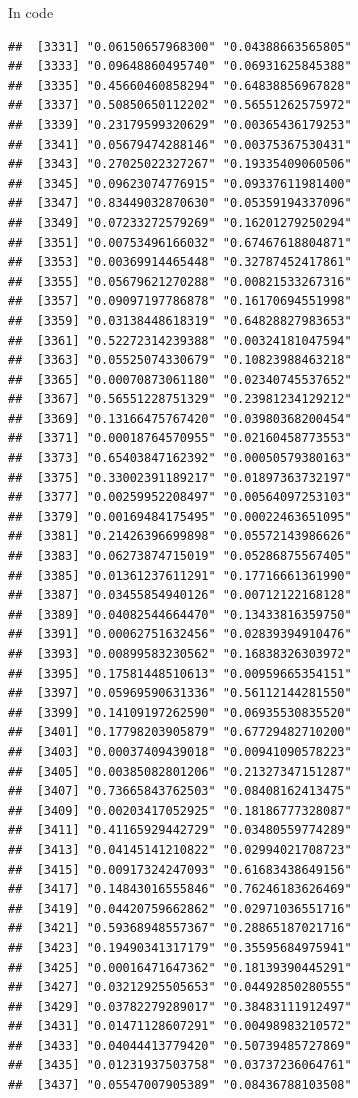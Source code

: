 \documentclass[ignorenonframetext,]{beamer}
\begin{document}
\begin{frame}[fragile]{In code}
\begin{verbatim}
##  [3331] "0.06150657968300" "0.04388663565805"
##  [3333] "0.09648860495740" "0.06931625845388"
##  [3335] "0.45660460858294" "0.64838856967828"
##  [3337] "0.50850650112202" "0.56551262575972"
##  [3339] "0.23179599320629" "0.00365436179253"
##  [3341] "0.05679474288146" "0.00375367530431"
##  [3343] "0.27025022327267" "0.19335409060506"
##  [3345] "0.09623074776915" "0.09337611981400"
##  [3347] "0.83449032870630" "0.05359194337096"
##  [3349] "0.07233272579269" "0.16201279250294"
##  [3351] "0.00753496166032" "0.67467618804871"
##  [3353] "0.00369914465448" "0.32787452417861"
##  [3355] "0.05679621270288" "0.00821533267316"
##  [3357] "0.09097197786878" "0.16170694551998"
##  [3359] "0.03138448618319" "0.64828827983653"
##  [3361] "0.52272314239388" "0.00324181047594"
##  [3363] "0.05525074330679" "0.10823988463218"
##  [3365] "0.00070873061180" "0.02340745537652"
##  [3367] "0.56551228751329" "0.23981234129212"
##  [3369] "0.13166475767420" "0.03980368200454"
##  [3371] "0.00018764570955" "0.02160458773553"
##  [3373] "0.65403847162392" "0.00050579380163"
##  [3375] "0.33002391189217" "0.01897363732197"
##  [3377] "0.00259952208497" "0.00564097253103"
##  [3379] "0.00169484175495" "0.00022463651095"
##  [3381] "0.21426396699898" "0.05572143986626"
##  [3383] "0.06273874715019" "0.05286875567405"
##  [3385] "0.01361237611291" "0.17716661361990"
##  [3387] "0.03455854940126" "0.00712122168128"
##  [3389] "0.04082544664470" "0.13433816359750"
##  [3391] "0.00062751632456" "0.02839394910476"
##  [3393] "0.00899583230562" "0.16838326303972"
##  [3395] "0.17581448510613" "0.00959665354151"
##  [3397] "0.05969590631336" "0.56112144281550"
##  [3399] "0.14109197262590" "0.06935530835520"
##  [3401] "0.17798203905879" "0.67729482710200"
##  [3403] "0.00037409439018" "0.00941090578223"
##  [3405] "0.00385082801206" "0.21327347151287"
##  [3407] "0.73665843762503" "0.08408162413475"
##  [3409] "0.00203417052925" "0.18186777328087"
##  [3411] "0.41165929442729" "0.03480559774289"
##  [3413] "0.04145141210822" "0.02994021708723"
##  [3415] "0.00917324247093" "0.61683438649156"
##  [3417] "0.14843016555846" "0.76246183626469"
##  [3419] "0.04420759662862" "0.02971036551716"
##  [3421] "0.59368948557367" "0.28865187021716"
##  [3423] "0.19490341317179" "0.35595684975941"
##  [3425] "0.00016471647362" "0.18139390445291"
##  [3427] "0.03212925505653" "0.04492850280555"
##  [3429] "0.03782279289017" "0.38483111912497"
##  [3431] "0.01471128607291" "0.00498983210572"
##  [3433] "0.04044413779420" "0.50739485727869"
##  [3435] "0.01231937503758" "0.03737236064761"
##  [3437] "0.05547007905389" "0.08436788103508"

\end{verbatim}
\end{frame}
\end{document}
